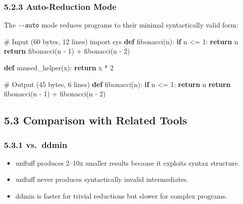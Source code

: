 \documentclass[
  letterpaper,
]{article}
\newenvironment{Shaded}{\begin{snugshade}}{\end{snugshade}}
\newcommand{\CommentTok}[1]{\textcolor[rgb]{0.37,0.37,0.37}{#1}}
\newcommand{\ControlFlowTok}[1]{\textcolor[rgb]{0.00,0.23,0.31}{\textbf{#1}}}
\newcommand{\DecValTok}[1]{\textcolor[rgb]{0.68,0.00,0.00}{#1}}
\newcommand{\ImportTok}[1]{\textcolor[rgb]{0.00,0.46,0.62}{#1}}
\newcommand{\KeywordTok}[1]{\textcolor[rgb]{0.00,0.23,0.31}{\textbf{#1}}}
\newcommand{\NormalTok}[1]{\textcolor[rgb]{0.00,0.23,0.31}{#1}}
\newcommand{\OperatorTok}[1]{\textcolor[rgb]{0.37,0.37,0.37}{#1}}
\providecommand{\tightlist}{%
  \setlength{\itemsep}{0pt}\setlength{\parskip}{0pt}}
\begin{document}
\subsubsection{5.2.3 Auto-Reduction Mode}\label{auto-reduction-mode}

The \texttt{-\/-auto} mode reduces programs to their minimal
syntactically valid form:

\begin{Shaded}
\begin{Highlighting}[]
\CommentTok{\# Input (60 bytes, 12 lines)}
\ImportTok{import}\NormalTok{ sys}
\KeywordTok{def}\NormalTok{ fibonacci(n):}
    \ControlFlowTok{if}\NormalTok{ n }\OperatorTok{\textless{}=} \DecValTok{1}\NormalTok{:}
        \ControlFlowTok{return}\NormalTok{ n}
    \ControlFlowTok{return}\NormalTok{ fibonacci(n }\OperatorTok{{-}} \DecValTok{1}\NormalTok{) }\OperatorTok{+}\NormalTok{ fibonacci(n }\OperatorTok{{-}} \DecValTok{2}\NormalTok{)}

\KeywordTok{def}\NormalTok{ unused\_helper(x):}
    \ControlFlowTok{return}\NormalTok{ x }\OperatorTok{*} \DecValTok{2}

\CommentTok{\# Output (45 bytes, 6 lines)}
\KeywordTok{def}\NormalTok{ fibonacci(n):}
    \ControlFlowTok{if}\NormalTok{ n }\OperatorTok{\textless{}=} \DecValTok{1}\NormalTok{:}
        \ControlFlowTok{return}\NormalTok{ n}
    \ControlFlowTok{return}\NormalTok{ fibonacci(n }\OperatorTok{{-}} \DecValTok{1}\NormalTok{) }\OperatorTok{+}\NormalTok{ fibonacci(n }\OperatorTok{{-}} \DecValTok{2}\NormalTok{)}
\end{Highlighting}
\end{Shaded}

\subsection{5.3 Comparison with Related
Tools}\label{comparison-with-related-tools}

\subsubsection{5.3.1 vs.~ddmin}\label{vs.-ddmin}

\begin{itemize}
\tightlist
\item
  unfluff produces 2--10x smaller results because it exploits syntax
  structure.
\item
  unfluff never produces syntactically invalid intermediates.
\item
  ddmin is faster for trivial reductions but slower for complex
  programs.
\end{itemize}
\end{document}
